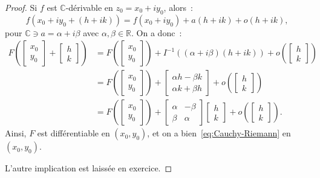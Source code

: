 \documentclass{report}
\theoremstyle{definition}
\theoremstyle{remark}
\numberwithin{equation}{section}
\newcommand{\C}{\mathbb C}
\newcommand{\R}{\mathbb R}
\begin{document}
			\begin{proof} Si $f$ est $\C$-dérivable en $z_0 = x_0 + iy_0$, alors~:
			\begin{equation}
				f(x_0 + iy_0 + (h + ik)) = f(x_0 + iy_0) + a(h+ik) + o(h+ik),
			\end{equation}
			pour $\C \ni a = \alpha + i\beta$ avec $\alpha, \beta \in \R$. On a donc~:
			\begin{align}
				F\left(\begin{bmatrix}x_0 \\ y_0\end{bmatrix} + \begin{bmatrix}h \\ k\end{bmatrix}\right)
					&= F\left(\begin{bmatrix}x_0 \\ y_0\end{bmatrix}\right) + I^{-1}\left((\alpha + i\beta)(h+ik)\right) + o\left(\begin{bmatrix}h\\k\end{bmatrix}\right) \\
					&= F\left(\begin{bmatrix}x_0 \\ y_0\end{bmatrix}\right) + \begin{bmatrix}\alpha h - \beta k \\\alpha k + \beta h\end{bmatrix} + o\left(\begin{bmatrix}h \\ k\end{bmatrix}\right) \\
					&= F\left(\begin{bmatrix}x_0 \\ y_0\end{bmatrix}\right) + \begin{bmatrix}\alpha & -\beta \\\beta & \alpha\end{bmatrix}\begin{bmatrix}h \\ k\end{bmatrix} + o\left(\begin{bmatrix}h \\ k\end{bmatrix}\right).
			\end{align}
			Ainsi, $F$ est différentiable en $(x_0, y_0)$, et on a bien~\eqref{eq:Cauchy-Riemann} en $(x_0, y_0)$.

			L'autre implication est laissée en exercice.
			\end{proof}
\end{document}
